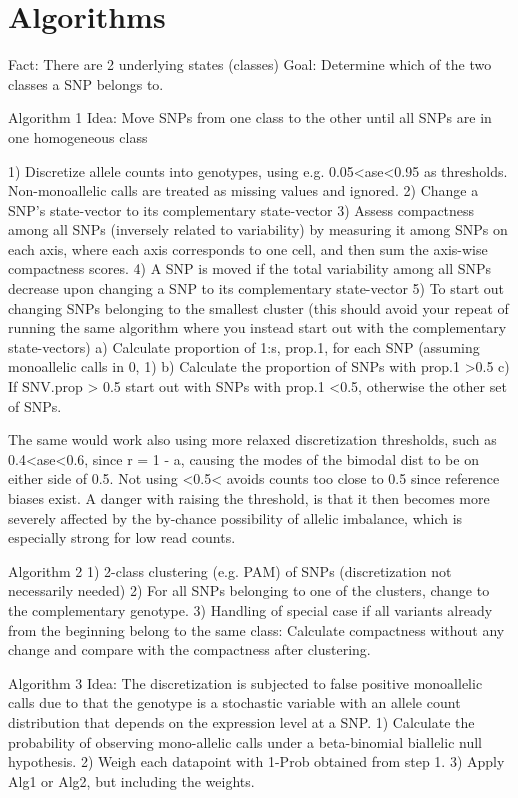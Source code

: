 \section{Algorithms}
Fact: There are 2 underlying states (classes)
Goal: Determine which of the two classes a SNP belongs to.

Algorithm 1
Idea: Move SNPs from one class to the other until all SNPs are in one homogeneous class

1) Discretize allele counts into genotypes, using e.g. 0.05<ase<0.95 as thresholds. Non-monoallelic calls are treated as missing values and ignored.
2) Change a SNP's state-vector to its complementary state-vector
3) Assess compactness among all SNPs (inversely related to variability) by measuring it among SNPs on each axis, where each axis corresponds to one cell, and then sum the axis-wise compactness scores.
4) A SNP is moved if the total variability among all SNPs decrease upon changing a SNP to its complementary state-vector
5) To start out changing SNPs belonging to the smallest cluster (this should avoid your repeat of running the same algorithm where you instead start out with the complementary state-vectors)
a) Calculate proportion of 1:s, prop.1, for each SNP (assuming monoallelic calls in {0, 1})
b) Calculate the proportion of SNPs with prop.1 >0.5
c) If SNV.prop > 0.5 start out with SNPs with prop.1 <0.5, otherwise the other set of SNPs.

The same would work also using more relaxed discretization thresholds, such as 0.4<ase<0.6, since r = 1 - a, causing the modes of the bimodal dist to be on either side of 0.5.
Not using <0.5< avoids counts too close to 0.5 since reference biases exist. A danger with raising the threshold, is that it then becomes more severely affected by the by-chance possibility of allelic imbalance, which is especially strong for low read counts.

Algorithm 2
1) 2-class clustering (e.g. PAM) of SNPs (discretization not necessarily needed)
2) For all SNPs belonging to one of the clusters, change to the complementary genotype.
3) Handling of special case if all variants already from the beginning belong to
the same class: Calculate compactness without any
change and compare with the compactness after clustering.

Algorithm 3
Idea: The discretization is subjected to false positive monoallelic calls due to that the genotype is a stochastic variable with an allele count distribution that depends on the expression level at a SNP.
1) Calculate the probability of observing mono-allelic calls under a beta-binomial biallelic null hypothesis.
2) Weigh each datapoint with 1-Prob obtained from step 1. 
3) Apply Alg1 or Alg2, but including the weights.

